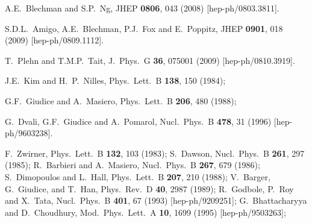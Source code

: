 \documentclass[12pt]{article}
\begin{document}
\begin{thebibliography}{999}
  A.E.~Blechman and S.P.~Ng,
  JHEP {\bf 0806}, 043 (2008)  
  [hep-ph/0803.3811].

S.D.L.~Amigo, A.E.~Blechman, P.J.~Fox and E.~Poppitz,
  JHEP {\bf 0901}, 018 (2009)
  [hep-ph/0809.1112].

  T.~Plehn and T.M.P.~Tait,
  J.\ Phys.\ G {\bf 36}, 075001 (2009)
  [hep-ph/0810.3919].

J.E.~Kim and H.~P.~Nilles, 
  Phys.\ Lett.\ B {\bf 138}, 150 (1984);

G.F.~Giudice and A.~Masiero, 
  Phys.\ Lett.\ B {\bf 206}, 480 (1988);

G.~Dvali, G.F.~Giudice and A.~Pomarol,
  Nucl.\ Phys.\ B {\bf 478}, 31 (1996)
  [hep-ph/9603238].

F.~Zwirner, 
  Phys.\ Lett.\ B {\bf 132}, 103 (1983);
S.~Dawson,
  Nucl.\ Phys.\ B {\bf 261}, 297 (1985);
R.~Barbieri and A.~Masiero, 
  Nucl.\ Phys.\ B {\bf 267}, 679 (1986);
S.~Dimopoulos and L.~Hall, 
  Phys.\ Lett.\ B {\bf 207}, 210 (1988);
V.~Barger, G.~Giudice, and T.~Han, 
  Phys.\ Rev.\ D {\bf 40}, 2987 (1989);
R.~Godbole, P.~Roy and X.~Tata, 
  Nucl.\ Phys.\ B {\bf 401}, 67 (1993)
  [hep-ph/9209251];
G.~Bhattacharyya and D.~Choudhury, 
  Mod.\ Phys.\ Lett.\ A {\bf 10}, 1699 (1995)
  [hep-ph/9503263];


\end{thebibliography}
\end{document}
